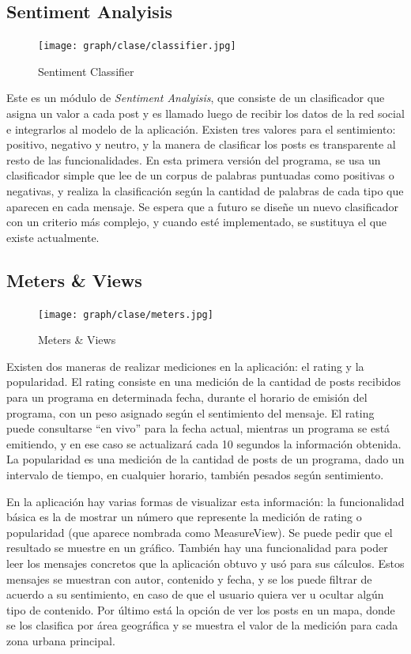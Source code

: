 \subsection{Sentiment Analyisis}

\begin{figure}[H]
\centering
\texttt{[image: graph/clase/classifier.jpg]}
\caption{Sentiment Classifier}
\end{figure}

Este es un módulo de \emph{Sentiment Analyisis}, que consiste de un clasificador que asigna un valor a cada post y es llamado luego de recibir los datos de la red social e integrarlos al modelo de la aplicación. Existen tres valores para el sentimiento: positivo, negativo y neutro, y la manera de clasificar los posts es transparente al resto de las funcionalidades. En esta primera versión del programa, se usa un clasificador simple que lee de un corpus de palabras puntuadas como positivas o negativas, y realiza la clasificación según la cantidad de palabras de cada tipo que aparecen en cada mensaje. Se espera que a futuro se diseñe un nuevo clasificador con un criterio más complejo, y cuando esté implementado, se sustituya el que existe actualmente.


\subsection{Meters \& Views}

\begin{figure}[H]
\centering
\texttt{[image: graph/clase/meters.jpg]}
\caption{Meters \& Views}
\end{figure}

Existen dos maneras de realizar mediciones en la aplicación: el rating y la popularidad. El rating consiste en una medición de la cantidad de posts recibidos para un programa en determinada fecha, durante el horario de emisión del programa, con un peso asignado según el sentimiento del mensaje. El rating puede consultarse ``en vivo'' para la fecha actual, mientras un programa se está emitiendo, y en ese caso se actualizará cada 10 segundos la información obtenida. La popularidad es una medición de la cantidad de posts de un programa, dado un intervalo de tiempo, en cualquier horario, también pesados según sentimiento.

En la aplicación hay varias formas de visualizar esta información: la funcionalidad básica es la de mostrar un número que represente la medición de rating o popularidad (que aparece nombrada como MeasureView). Se puede pedir que el resultado se muestre en un gráfico. También hay una funcionalidad para poder leer los mensajes concretos que la aplicación obtuvo y usó para sus cálculos. Estos mensajes se muestran con autor, contenido y fecha, y se los puede filtrar de acuerdo a su sentimiento, en caso de que el usuario quiera ver u ocultar algún tipo de contenido. Por último está la opción de ver los posts en un mapa, donde se los clasifica por área geográfica y se muestra el valor de la medición para cada zona urbana principal.


